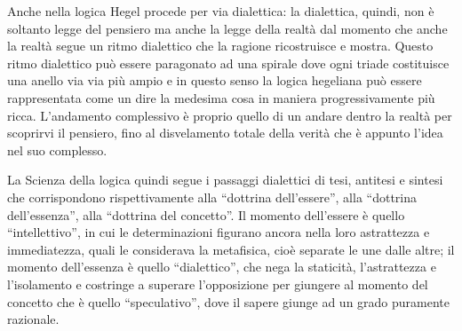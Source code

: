 \documentclass[a4paper,12pt,oneside,openany]{book}%
\begin{document}
Anche nella logica Hegel procede per via dialettica: la dialettica, quindi, non è soltanto legge del pensiero ma anche la legge della realtà dal momento che anche la realtà segue un ritmo dialettico che la ragione ricostruisce e mostra. Questo ritmo dialettico può essere paragonato ad una spirale dove ogni triade costituisce una anello via via più ampio e in questo senso la logica hegeliana può essere rappresentata come un dire la medesima cosa in maniera progressivamente più ricca. L’andamento complessivo è proprio quello di un andare dentro la realtà per scoprirvi il pensiero, fino al disvelamento totale della verità che è appunto l’idea nel suo complesso.

La Scienza della logica quindi segue i passaggi dialettici di tesi, antitesi e sintesi che corrispondono rispettivamente alla “dottrina dell’essere”, alla “dottrina dell’essenza”, alla “dottrina del concetto”. Il momento dell’essere è quello “intellettivo”, in cui le determinazioni figurano ancora nella loro astrattezza e immediatezza, quali le considerava la metafisica, cioè separate le une dalle altre; il momento dell’essenza è quello “dialettico”, che nega la staticità, l’astrattezza e l’isolamento e costringe a superare l’opposizione per giungere al momento del concetto che è quello “speculativo”, dove il sapere giunge ad un grado puramente razionale.
\end{document}
